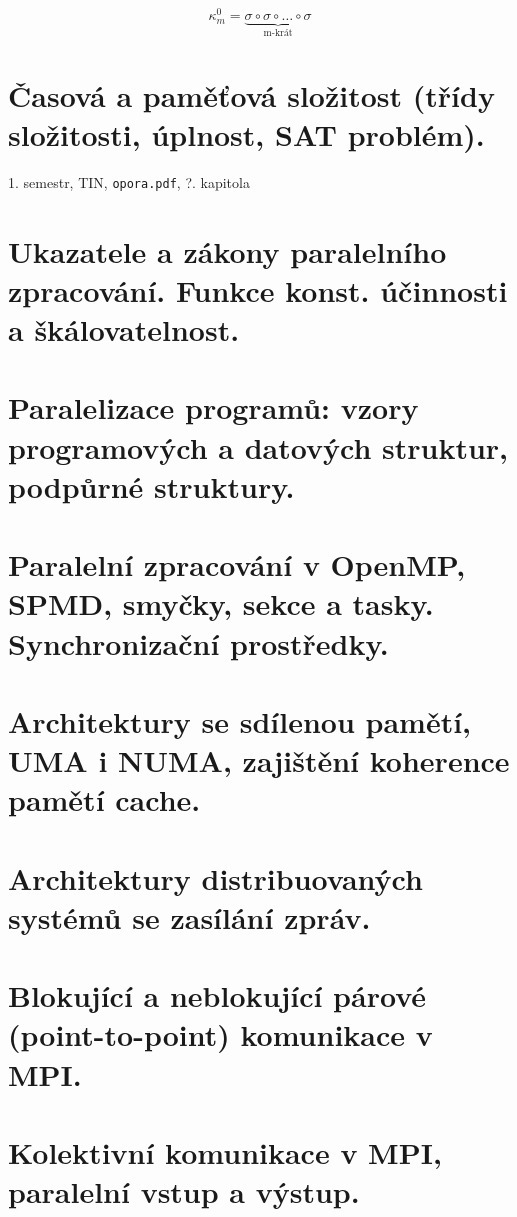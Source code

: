 \documentclass[a4paper, 11pt]{report}
\begin{document}
$$\kappa_m^0 = \underbrace{\sigma \circ \sigma \circ \dots \circ \sigma}_\text{m-krát}$$




\chapter{Časová a paměťová složitost (třídy složitosti, úplnost, SAT problém).} \label{cha:25}
1. semestr, TIN, \texttt{opora.pdf}, ?. kapitola

\chapter{Ukazatele a zákony paralelního zpracování. Funkce konst. účinnosti a škálovatelnost.} \label{cha:26}
\chapter{Paralelizace programů: vzory programových a datových struktur, podpůrné struktury.} \label{cha:27}
\chapter{Paralelní zpracování v OpenMP, SPMD, smyčky, sekce a tasky. Synchronizační prostředky.} \label{cha:28}
\chapter{Architektury se sdílenou pamětí, UMA i NUMA, zajištění koherence pamětí cache.} \label{cha:29}
\chapter{Architektury distribuovaných systémů se zasílání zpráv.} \label{cha:30}
\chapter{Blokující a neblokující párové (point-to-point) komunikace v MPI.} \label{cha:31}
\chapter{Kolektivní komunikace v MPI, paralelní vstup a výstup.} \label{cha:32}
\end{document}
